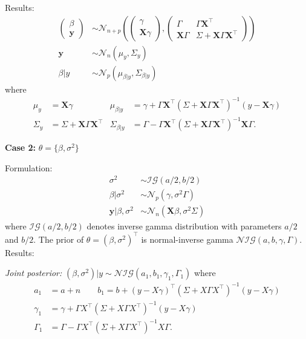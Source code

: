 \documentclass[5pt,a4paper, twocolumn]{article}
\begin{document}
{Results:
\begin{align*}
\begin{pmatrix}
\beta \\
\mathbf{y}
\end{pmatrix}
&\sim \mathcal{N}_{n+p}
\left(
\begin{pmatrix}
\gamma \\
\mathbf{X}\gamma
\end{pmatrix},
\begin{pmatrix}
\Gamma & \Gamma \mathbf{X}^\top \\
\mathbf{X}\Gamma & \Sigma + \mathbf{X}\Gamma \mathbf{X}^\top
\end{pmatrix}
\right) \\
\mathbf{y} &\sim \mathcal{N}_n(\mu_y, \Sigma_y)\\
\beta \vert y &\sim \mathcal{N}_p(\mu_{\beta|y}, \Sigma_{\beta \vert y})
\end{align*}
where
\begin{align*}
\mu_y &= \mathbf{X}\gamma & \mu_{\beta \vert y} &= \gamma + \Gamma \mathbf{X}^\top(\Sigma + \mathbf{X}\Gamma \mathbf{X}^\top)^{-1}(y - \mathbf{X}\gamma) \\
\Sigma_y &= \Sigma + \mathbf{X}\Gamma \mathbf{X}^\top &
\Sigma_{\beta \vert y} &= \Gamma - \Gamma \mathbf{X}^\top(\Sigma + \mathbf{X}\Gamma \mathbf{X}^\top)^{-1}\mathbf{X}\Gamma.
\end{align*}

\textbf{Case 2:} $\theta=\{\beta, \sigma^2\}$

Formulation:
\begin{align*}
\sigma^2 &\sim \mathcal{IG}(a/2, b/2)\\
\beta \vert \sigma^2 &\sim \mathcal{N}_p(\gamma, \sigma^2\Gamma)\\
\mathbf{y} \vert \beta, \sigma^2 &\sim \mathcal{N}_n(\mathbf{X}\beta, \sigma^2\Sigma)
\end{align*}
where $\mathcal{IG}(a/2, b/2)$ denotes inverse gamma distribution with parameters $a/2$ and $b/2$. The prior of $\theta = (\beta, \sigma^2)^\top$ is normal-inverse gamma $\mathcal{NIG}(a, b, \gamma, \Gamma)$.\\

Results:

\emph{Joint posterior:} $(\beta, \sigma^2) \vert y \sim \mathcal{NIG}(a_1, b_1, \gamma_1, \Gamma_1)$ where
\begin{align*}
a_1 &= a + n \qquad
b_1 = b + (y - X\gamma)^\top(\Sigma + X\Gamma X^\top)^{-1}(y - X\gamma) \\
\gamma_1 &= \gamma + \Gamma X^\top(\Sigma + X\Gamma X^\top)^{-1}(y - X\gamma) \\
\Gamma_1 &= \Gamma - \Gamma X^\top(\Sigma + X\Gamma X^\top)^{-1}X\Gamma.
\end{align*}

}
\end{document}
